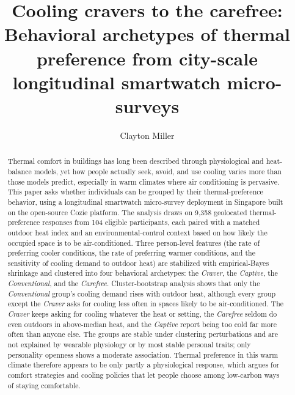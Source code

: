 \documentclass[final,5p,times,twocolumn]{elsarticle}
\begin{document}
\begin{frontmatter}


\title{Cooling cravers to the carefree: Behavioral archetypes of thermal preference from city-scale longitudinal smartwatch micro-surveys}

\author[smu,smuui]{Clayton Miller}



\begin{abstract}
Thermal comfort in buildings has long been described through physiological and heat-balance models, yet how people actually seek, avoid, and use cooling varies more than those models predict, especially in warm climates where air conditioning is pervasive.
This paper asks whether individuals can be grouped by their thermal-preference behavior, using a longitudinal smartwatch micro-survey deployment in Singapore built on the open-source Cozie platform.
The analysis draws on 9{,}358 geolocated thermal-preference responses from 104 eligible participants, each paired with a matched outdoor heat index and an environmental-control context based on how likely the occupied space is to be air-conditioned.
Three person-level features (the rate of preferring cooler conditions, the rate of preferring warmer conditions, and the sensitivity of cooling demand to outdoor heat) are stabilized with empirical-Bayes shrinkage and clustered into four behavioral archetypes: the \emph{Craver}, the \emph{Captive}, the \emph{Conventional}, and the \emph{Carefree}.
Cluster-bootstrap analysis shows that only the \emph{Conventional} group's cooling demand rises with outdoor heat, although every group except the \emph{Craver} asks for cooling less often in spaces likely to be air-conditioned.
The \emph{Craver} keeps asking for cooling whatever the heat or setting, the \emph{Carefree} seldom do even outdoors in above-median heat, and the \emph{Captive} report being too cold far more often than anyone else.
The groups are stable under clustering perturbations and are not explained by wearable physiology or by most stable personal traits; only personality openness shows a moderate association.
Thermal preference in this warm climate therefore appears to be only partly a physiological response, which argues for comfort strategies and cooling policies that let people choose among low-carbon ways of staying comfortable.
\end{abstract}



\end{frontmatter}
\end{document}
